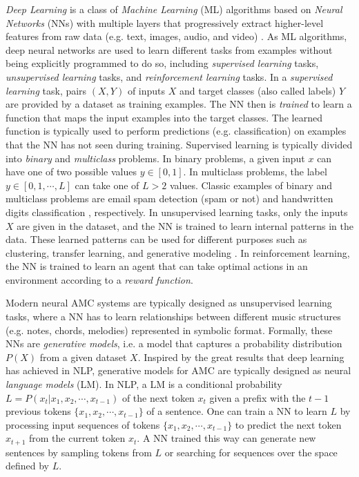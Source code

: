 \textit{Deep Learning} is a class of \textit{Machine Learning} (ML) algorithms based on \textit{Neural Networks} (NNs) with multiple layers that progressively extract higher-level features from raw data (e.g. text, images, audio, and video) \cite{goodfellow2016deep}. As ML algorithms, deep neural networks are used to learn different tasks from examples without being explicitly programmed to do so, including \textit{supervised learning} tasks, \textit{unsupervised learning} tasks, and \textit{reinforcement learning} tasks. In a \textit{supervised learning} task, pairs $(X,Y)$ of inputs $X$ and target classes (also called labels) $Y$ are provided by a dataset as training examples. The NN then is \textit{trained} to learn a function that maps the input examples into the target classes. The learned function is typically used to perform predictions (e.g. classification) on examples that the NN has not seen during training. Supervised learning is typically divided into \textit{binary} and \textit{multiclass} problems. In binary problems, a given input $x$ can have one of two possible values $y \in [0, 1]$. In multiclass problems, the label $y \in [0, 1, \cdots, L]$ can take one of $L > 2$ values. Classic examples of binary and multiclass problems are email spam detection (spam or not) and handwritten digits classification \cite{lecun1998gradient}, respectively. In unsupervised learning tasks, only the inputs $X$ are given in the dataset, and the NN is trained to learn internal patterns in the data. These learned patterns can be used for different purposes such as clustering, transfer learning, and generative modeling \cite{bengio2012unsupervised}. In reinforcement learning, the NN is trained to learn an agent that can take optimal actions in an environment according to a \textit{reward function}.

Modern neural AMC systems are typically designed as unsupervised learning tasks, where a NN has to learn relationships between different music structures (e.g. notes, chords, melodies) represented in symbolic format. Formally, these NNs are \textit{generative models}, i.e. a model that captures a probability distribution $P(X)$ from a given dataset $X$. Inspired by the great results that deep learning has achieved in NLP, generative models for AMC are typically designed as neural \textit{language models} (LM). In NLP, a LM is a conditional probability $L = P(x_t|x_1, x_2, \cdots, x_{t-1})$ of the next token $x_t$ given a prefix with the $t-1$ previous tokens $\{x_1, x_2, \cdots, x_{t-1}\}$ of a sentence. One can train a NN to learn $L$ by processing input sequences of tokens $\{x_1, x_2, \cdots, x_{t-1}\}$ to predict the next token $x_{t+1}$ from the current token $x_t$. A NN trained this way can generate new sentences by sampling tokens from $L$ or searching for sequences over the space defined by $L$.

